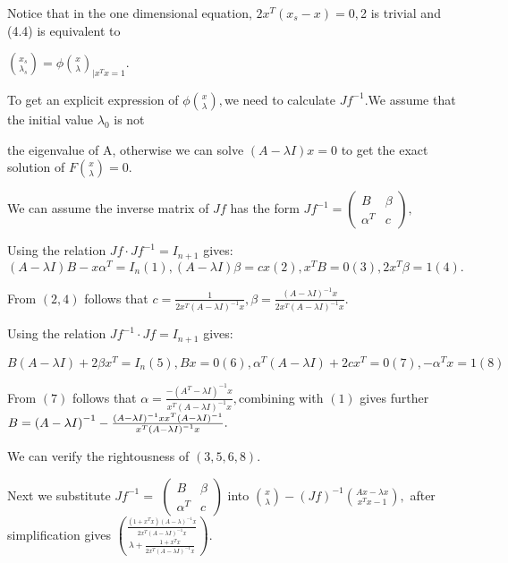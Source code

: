 \documentclass{article}
\begin{document}

Notice that in the one dimensional equation, $2x^{T}\left( x_{s}-x\right) =0,
$2 is trivial and (4.4) is equivalent to

$\binom{x_{s}}{\lambda _{s}}=\phi \binom{x}{\lambda }_{|x^{T}x=1}.$

To get an explicit expression of $\phi \binom{x}{\lambda },$we need to
calculate $Jf^{-1}.$We assume that the initial value $\lambda _{0}$ is not 

the eigenvalue of A, otherwise we can solve $\left( A-\lambda I\right) x=0$
to get the exact solution of  $F\binom{x}{\lambda }=0.$

We can assume the inverse matrix of $Jf$ has the form $Jf^{-1}=\left( 
\begin{array}{cc}
B & \beta  \\ 
\alpha ^{T} & c%
\end{array}%
\right) ,$

\bigskip Using the relation  $Jf\cdot Jf^{-1}=I_{n+1}$ gives: $\left(
A-\lambda I\right) B-x\alpha ^{T}=I_{n}\left( 1\right) ,\left( A-\lambda
I\right) \beta =cx\left( 2\right) ,x^{T}B=0\left( 3\right) ,2x^{T}\beta
=1\left( 4\right) .$

From $\left( 2,4\right) $ follows that $c=\frac{1}{2x^{T}\left( A-\lambda
I\right) ^{-1}x},\beta =\frac{\left( A-\lambda I\right) ^{-1}x}{2x^{T}\left(
A-\lambda I\right) ^{-1}x}.$

Using the relation $Jf^{-1}\cdot Jf=I_{n+1}$ gives: 

$B\left( A-\lambda I\right) +2\beta x^{T}=I_{n}\left( 5\right) ,Bx=0\left(
6\right) ,\alpha ^{T}\left( A-\lambda I\right) +2cx^{T}=0\left( 7\right)
,-\alpha ^{T}x=1\left( 8\right) $

From $\left( 7\right) $ follows that $\alpha =\frac{-\left( A^{T}-\lambda
I\right) ^{-1}x}{x^{T}\left( A-\lambda I\right) ^{-1}x},$combining with $%
\left( 1\right) $ gives further $B=\left( A-\lambda I\right) ^{-1}-\frac{%
\left( A-\lambda I\right) ^{-1}xx^{T}\left( A-\lambda I\right) ^{-1}}{%
x^{T}\left( A-\lambda I\right) ^{-1}x}.$

We can verify the rightousness of $\left( 3,5,6,8\right) .$

Next we substitute $Jf^{-1}=$ $\left( 
\begin{array}{cc}
B & \beta  \\ 
\alpha ^{T} & c%
\end{array}%
\right) $ into $\binom{x}{\lambda }-\left( Jf\right) ^{-1}\binom{Ax-\lambda x%
}{x^{T}x-1},$ after simplification gives $\binom{\frac{\left(
1+x^{T}x\right) \left( A-\lambda \right) ^{-1}x}{2x^{T}\left( A-\lambda
I\right) ^{-1}x}}{\lambda +\frac{1+x^{T}x}{2x^{T}\left( A-\lambda I\right)
^{-1}x}}.$
\end{document}

